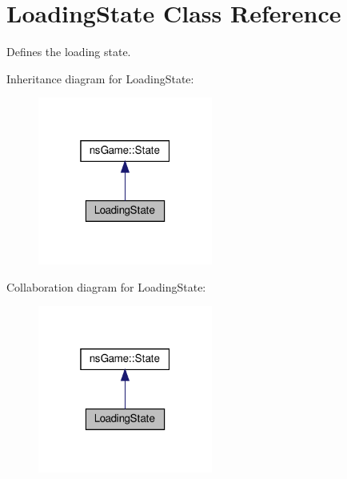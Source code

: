 \hypertarget{class_loading_state}{}\section{Loading\+State Class Reference}
\label{class_loading_state}


Defines the loading state.  




Inheritance diagram for Loading\+State\+:\nopagebreak
\begin{figure}[H]
\begin{center}
\leavevmode
\includegraphics[width=163pt]{class_loading_state__inherit__graph}
\end{center}
\end{figure}


Collaboration diagram for Loading\+State\+:\nopagebreak
\begin{figure}[H]
\begin{center}
\leavevmode
\includegraphics[width=163pt]{class_loading_state__coll__graph}
\end{center}
\end{figure}

